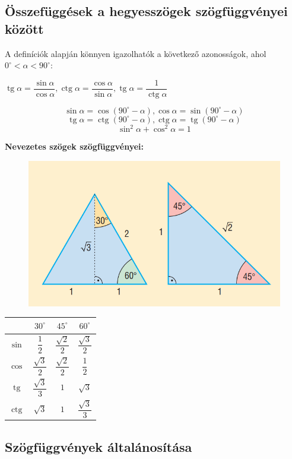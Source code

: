 \documentclass[12pt,a4paper]{article}
\DeclareMathOperator{\tg}{tg}
\DeclareMathOperator{\ctg}{ctg}
\begin{document}
\subsection{Összefüggések a hegyesszögek szögfüggvényei között}
A definíciók alapján könnyen igazolhatók a következő azonosságok, ahol $0^\circ<\alpha<90^\circ$:
\begin{center}
$\tg\alpha=\dfrac{\sin \alpha}{\cos \alpha}, \ctg\alpha=\dfrac{\cos \alpha}{\sin \alpha}, \tg\alpha=\dfrac{1}{\ctg \alpha}$

\[\sin \alpha = \cos (90^\circ-\alpha), \cos \alpha = \sin (90^\circ-\alpha)\]
\[\tg \alpha = \ctg (90^\circ-\alpha), \ctg \alpha = \tg (90^\circ-\alpha)\]
\[\sin^2\alpha + \cos^2\alpha = 1\]
\end{center}
\textbf{Nevezetes szögek szögfüggvényei:}
\begin{figure}[h]
\centering
\includegraphics[scale=0.3]{geometry/hegyesszogfgv}
\end{figure}

\begin{center}
\begin{tabular}{c | c | c | c}
&$30^\circ$&$45^\circ$&$60^\circ$ \\
\hline
$\sin$ &$\dfrac{1}{2}$&$\dfrac{\sqrt{2}}{2}$&$\dfrac{\sqrt{3}}{2}$ \\[15pt] \hline
$\cos$ &$\dfrac{\sqrt{3}}{2}$&$\dfrac{\sqrt{2}}{2}$&$\dfrac{1}{2}$ \\[15pt] \hline
$\tg$ &$\dfrac{\sqrt{3}}{3}$&$1$&$\sqrt{3}$ \\[15pt] \hline
$\ctg$ &$\sqrt{3}$&$1$&$\dfrac{\sqrt{3}}{3}$
\end{tabular}
\end{center}

\subsection{Szögfüggvények általánosítása}
\end{document}
